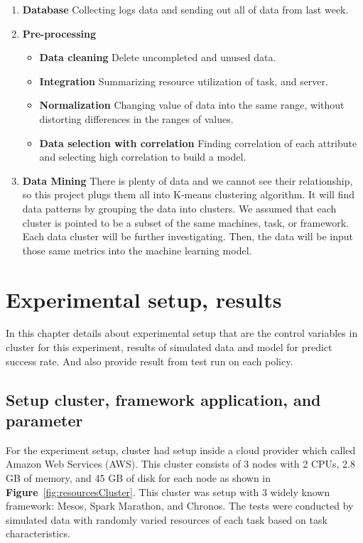 \documentclass[12pt,oneside,openright,a4paper]{cpe-english-project}
\begin{document}
\begin{enumerate}
  \item \textbf{Database } Collecting logs data and sending out all of data from last week.
  \item \textbf{Pre-processing}
    \begin{itemize}
      \item \textbf{Data cleaning } Delete uncompleted and unused data.
      \item \textbf{Integration } Summarizing resource utilization of task, and server.
      \item \textbf{Normalization } Changing value of data into the same range, without distorting differences in the ranges of values.
      \item \textbf{Data selection with correlation } Finding correlation of each attribute and selecting high correlation to build a model.
    \end{itemize}
  \item \textbf{Data Mining } There is plenty of data and we cannot see their relationship, so this project plugs them all into K-means clustering algorithm. It will find data patterns by grouping the data into clusters. We assumed that each cluster is pointed to be a subset of the same machines, task, or framework. Each data cluster will be further investigating. Then, the data will be input those same metrics into the machine learning model.
\end{enumerate}
\chapter{Experimental setup, results}

\hspace{10mm} In this chapter details about experimental setup that are the control variables in cluster for this experiment, results of simulated data and model for predict success rate. And also provide result from test run on each policy.

\section{Setup cluster, framework application, and parameter}
\hspace{10mm}For the experiment setup, cluster had setup inside a cloud provider which called Amazon Web Services (AWS). This cluster consists of 3 nodes with 2 CPUs, 2.8 GB of memory, and 45 GB of disk for each node as shown in \textbf{Figure}~\ref{fig:resourcesCluster}. This cluster was setup with 3 widely known framework: Mesos, Spark Marathon, and Chronos. The tests were conducted by simulated data with randomly varied resources of each task based on task characteristics. 
\end{document}
